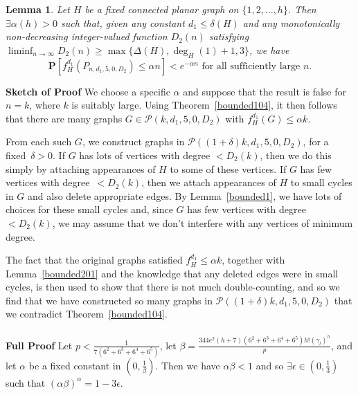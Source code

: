\documentclass{article}
\newtheorem{Lemma}[Theorem]{Lemma}
\newtheorem{Proof of Theorem}{Proof of Theorem}
\begin{document}
\begin{Lemma} \label{bounded106}
Let $H$ be a fixed connected planar graph on $\{ 1,2, \ldots, h \}$.
Then $\exists \alpha(h)>0$ such that,
given any constant $d_{1} \leq \delta(H)$
and any monotonically non-decreasing integer-valued function $D_{2}(n)$ satisfying
$\liminf_{n \to \infty}D_{2}(n) \geq \max \{ \Delta(H), \deg_{H}(1)+1, 3 \}$,
we have
\begin{displaymath}
\mathbf{P} [ f_{H}^{d_{1}} (P_{n,d_{1},5,0,D_{2}}) \leq \alpha n ] < e^{-\alpha n} \textrm{ for all sufficiently large }n.
\end{displaymath}
\end{Lemma}
\textbf{Sketch of Proof}
We choose a specific $\alpha$
and suppose that the result is false for~$n=k$,
where $k$ is suitably large.
Using Theorem~\ref{bounded104},
it then follows that there are many graphs $G \in \mathcal{P}(k,d_{1},5,0,D_{2})$ with $f_{H}^{d_{1}}(G) \leq \alpha k$.

From each such $G$,
we construct graphs in $\mathcal{P}((1+\delta)k,d_{1},5,0,D_{2})$, for a fixed~$\delta >0$.
If $G$ has lots of vertices with degree $<D_{2}(k)$,
then we do this simply by attaching appearances of $H$ to some of these vertices.
If $G$ has few vertices with degree~$<D_{2}(k)$,
then we attach appearances of $H$ to small cycles in $G$ 
and also delete appropriate edges.
By Lemma~\ref{bounded1},
we have lots of choices for these small cycles
and, since $G$ has few vertices with degree $<D_{2}(k)$,
we may assume that we don't interfere with any vertices of minimum degree.

The fact that the original graphs satisfied $f_{H}^{d_{1}} \leq \alpha k$,
together with Lemma~\ref{bounded201} and the knowledge that any deleted edges were in small cycles,
is then used to show that there is not much double-counting,
and so we find that we have constructed so many graphs in $\mathcal{P}((1+\delta)k,d_{1},5,0,D_{2})$
that we contradict Theorem~\ref{bounded104}. \\
\\
\textbf{Full Proof}
Let $p < \frac{1}{7(6^{2}+6^{3}+6^{4}+6^{5})}$,
let $\beta = \frac{344e^{2}(h+7)(6^{2}+6^{3}+6^{4}+6^{5})h! \left( \gamma_{l} \right)^{h}}{p}$,
and let $\alpha$ be a fixed constant in 
$\left( 0, \frac{1}{\beta} \right)$.
Then we have $\alpha \beta <1$ 
and so $\exists \epsilon \in \left( 0,\frac{1}{3} \right)$ such that $(\alpha \beta)^{\alpha} = 1-3 \epsilon$.
\end{document}
